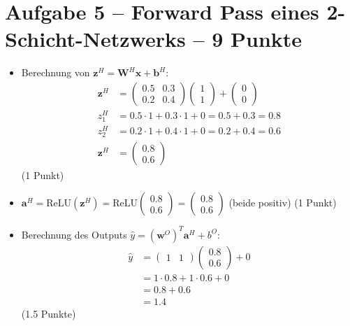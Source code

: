 \newpage

\section*{Aufgabe 5 -- Forward Pass eines 2-Schicht-Netzwerks -- 9 Punkte}

\begin{itemize}
\item [a)] Berechnung von $\mathbf{z}^H = \mathbf{W}^H \mathbf{x} + \mathbf{b}^H$:
\begin{align*}
\mathbf{z}^H &= \begin{pmatrix} 0.5 & 0.3 \\ 0.2 & 0.4 \end{pmatrix} \begin{pmatrix} 1 \\ 1 \end{pmatrix} + \begin{pmatrix} 0 \\ 0 \end{pmatrix} \\
z_1^H &= 0.5 \cdot 1 + 0.3 \cdot 1 + 0 = 0.5 + 0.3 = 0.8 \\
z_2^H &= 0.2 \cdot 1 + 0.4 \cdot 1 + 0 = 0.2 + 0.4 = 0.6 \\
\mathbf{z}^H &= \begin{pmatrix} 0.8 \\ 0.6 \end{pmatrix}
\end{align*}
(1 Punkt)
\end{itemize}

\begin{itemize}
\item [b)] $\mathbf{a}^H = \text{ReLU}(\mathbf{z}^H) = \text{ReLU}\begin{pmatrix} 0.8 \\ 0.6 \end{pmatrix} = \begin{pmatrix} 0.8 \\ 0.6 \end{pmatrix}$ (beide positiv) (1 Punkt)
\end{itemize}

\begin{itemize}
\item [c)] Berechnung des Outputs $\hat{y} = (\mathbf{w}^O)^T \mathbf{a}^H + b^O$:
\begin{align*}
\hat{y} &= \begin{pmatrix} 1 & 1 \end{pmatrix} \begin{pmatrix} 0.8 \\ 0.6 \end{pmatrix} + 0 \\
&= 1 \cdot 0.8 + 1 \cdot 0.6 + 0 \\
&= 0.8 + 0.6 \\
&= 1.4
\end{align*}
(1.5 Punkte)
\end{itemize}

